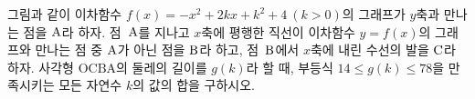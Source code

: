 \hspace*{2mm}\begin{minipage}[t]{\dimexpr\linewidth-2mm\relax}\vspace{0pt}
\noindent\begin{minipage}[t]{0.58\linewidth}\vspace{0pt}\raggedright 그림과 같이 이차함수 $f(x)=-x^2+2kx+k^2+4\ (k>0)$의 그래프가 $y$축과 만나는 점을 $\mathrm{A}$라 하자. 점~$\mathrm{A}$를 지나고 $x$축에 평행한 직선이 이차함수 $y=f(x)$의 그래프와 만나는 점 중 $\mathrm{A}$가 아닌 점을 $\mathrm{B}$라 하고, 점~$\mathrm{B}$에서 $x$축에 내린 수선의 발을 $\mathrm{C}$라 하자. 사각형 $\mathrm{OCBA}$의 둘레의 길이를 $g(k)$라 할 때, 부등식 $14\le g(k)\le 78$을 만족시키는 모든 자연수 $k$의 값의 합을 구하시오. \end{minipage}\hfill\begin{minipage}[t]{0.4\linewidth}\vspace{0pt}\centering \resizebox{\ifdim\width>\linewidth\linewidth\else\width\fi}{!}{}\end{minipage}\par\end{minipage}
